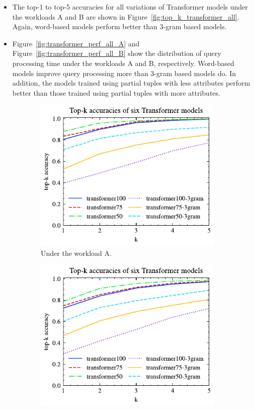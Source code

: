 \begin{itemize}
	\item The top-1 to top-5 accuracies for all variations of Transformer models under the workloads A and B are shown in Figure~\ref{fig:top_k_transformer_all}. 
	Again, word-based models perform better than 3-gram based models. 
	\item Figure~\ref{fig:transformer_perf_all_A} and Figure~\ref{fig:transformer_perf_all_B} show the distribution of query processing time under the workloads A and B, respectively.
	Word-based models improve query processing more than 3-gram based models do.
	In addition, the models trained using partial tuples with less attributes perform better than those trained using partial tuples with more attributes.
\end{itemize}
\begin{figure}[!th]
	\centering
	\begin{subfigure}{0.45\textwidth}
		\centering
		\includegraphics[]{my/graphics/top_k_transformer_A.pdf}
		\caption{Under the workload A.}
		\label{fig:top_k_transformer_A}
	\end{subfigure}
	\hfill
	\begin{subfigure}{0.45\textwidth}
		\centering
		\includegraphics[]{my/graphics/top_k_transformer_B.pdf}

\end{subfigure}
\end{figure}

